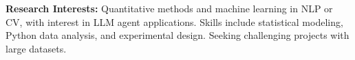  \small{ \textbf{Research Interests: } Quantitative methods and machine learning in NLP or CV, with interest in LLM agent applications. Skills include statistical modeling, Python data analysis, and experimental design. Seeking challenging projects with large datasets.}